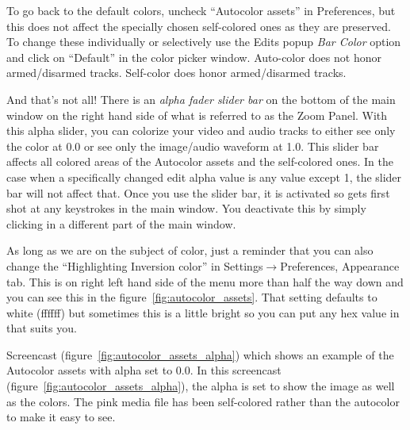 To go back to the default colors, uncheck “Autocolor assets” in Preferences, but this does not affect the specially chosen self-colored ones as they are preserved.  
To change these individually or  selectively use the Edits popup \emph{Bar Color} option and click on “Default” in the color picker window.  Auto-color does not honor armed/disarmed tracks.  
Self-color does honor armed/disarmed tracks.

And that’s not all!  
There is an \emph{alpha fader slider bar} on the bottom of the main window on the right hand side of what is referred to as the Zoom Panel.  
With this alpha slider, you can colorize your video and audio tracks to either see only the color at 0.0 or see only the image/audio waveform at 1.0.  
This slider bar affects all colored areas of the Autocolor assets and the self-colored ones.  
In the case when a specifically changed edit alpha value is any value except 1, the slider bar will not affect that.  
Once you use the slider bar, it is activated so gets first shot at any keystrokes in the main window.  
You deactivate this by simply clicking in a different part of the main window.  

As long as we are on the subject of color, just a reminder that you can also change the “Highlighting Inversion color” in Settings$\rightarrow$Preferences, Appearance tab.  
This is on right left hand side of the menu more than half the way down and you can see this in the figure~\ref{fig:autocolor_assets}.  
That setting defaults to white (ffffff) but sometimes this is a little bright so you can put any hex value in that suits you.

Screencast (figure~\ref{fig:autocolor_assets_alpha}) which shows an example of the Autocolor assets with alpha set to 0.0.
In this screencast (figure~\ref{fig:autocolor_assets_alpha}), the alpha is set to show the image as well as the colors.  The pink media file has been self-colored rather than the autocolor to make it easy to see.

